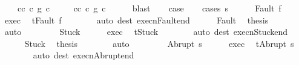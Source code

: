 \begin{isabellebody}
\ \ \ \ c{}{\isacharunderscore}c{}{\isacharprime}{\isacharcolon}\ {\isachardoublequoteopen}c{}\ {\isasymsubseteq}\isactrlsub g\ c{}{\isacharprime}{\isachardoublequoteclose}\ \isanewline
\ \ \ \ c{}{\isacharunderscore}c{}{\isacharprime}{\isacharcolon}\ {\isachardoublequoteopen}c{}\ {\isasymsubseteq}\isactrlsub g\ c{}{\isacharprime}{\isachardoublequoteclose}\isanewline
\ \ \ \ \isamarkupfalse%
\ blast\isanewline
\ \ \isamarkupfalse%
\ {\isacharquery}case\isanewline
\ \ \isamarkupfalse%
\ {\isacharparenleft}cases\ {\isachardoublequoteopen}s{\isachardoublequoteclose}{\isacharparenright}\isanewline
\ \ \ \ \isamarkupfalse%
\ {\isacharparenleft}Fault\ f{\isacharparenright}\isanewline
\ \ \ \ \isamarkupfalse%
\ exec\ \isamarkupfalse%
\ {\isachardoublequoteopen}t{\isacharequal}Fault\ f{\isachardoublequoteclose}\isanewline
\ \ \ \ \ \ \isamarkupfalse%
\ {\isacharparenleft}auto\ dest{\isacharcolon}\ execn{\isacharunderscore}Fault{\isacharunderscore}end{\isacharparenright}\isanewline
\ \ \ \ \isamarkupfalse%
\ Fault\ \isamarkupfalse%
\ {\isacharquery}thesis\isanewline
\ \ \ \ \ \ \isamarkupfalse%
\ auto\isanewline
\ \ \isamarkupfalse%
\isanewline
\ \ \ \ \isamarkupfalse%
\ Stuck\isanewline
\ \ \ \ \isamarkupfalse%
\ exec\ \isamarkupfalse%
\ {\isachardoublequoteopen}t{\isacharequal}Stuck{\isachardoublequoteclose}\isanewline
\ \ \ \ \ \ \isamarkupfalse%
\ {\isacharparenleft}auto\ dest{\isacharcolon}\ execn{\isacharunderscore}Stuck{\isacharunderscore}end{\isacharparenright}\isanewline
\ \ \ \ \isamarkupfalse%
\ Stuck\ \isamarkupfalse%
\ {\isacharquery}thesis\isanewline
\ \ \ \ \ \ \isamarkupfalse%
\ auto\isanewline
\ \ \isamarkupfalse%
\isanewline
\ \ \ \ \isamarkupfalse%
\ {\isacharparenleft}Abrupt\ s{\isacharprime}{\isacharparenright}\isanewline
\ \ \ \ \isamarkupfalse%
\ exec\ \isamarkupfalse%
\ {\isachardoublequoteopen}t{\isacharequal}Abrupt\ s{\isacharprime}{\isachardoublequoteclose}\isanewline
\ \ \ \ \ \ \isamarkupfalse%
\ {\isacharparenleft}auto\ dest{\isacharcolon}\ execn{\isacharunderscore}Abrupt{\isacharunderscore}end{\isacharparenright}\isanewline
\ \ \ \ \isamarkupfalse%

\end{isabellebody}

